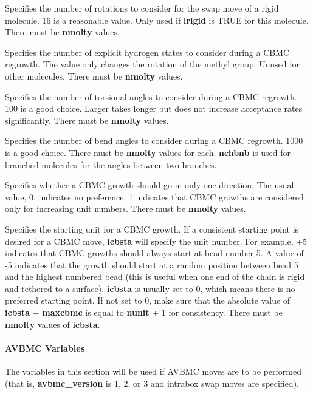 \documentclass[12pt,letterpaper]{article}
\begin{document}
 Specifies the number of rotations to
consider for the swap move of a rigid molecule. 16 is a
reasonable value. Only used if {\bf lrigid} is TRUE for this
molecule. There must be {\bf nmolty} values.

 Specifies the number of explicit
hydrogen states to consider during a CBMC regrowth. The
value only changes the rotation of the methyl group. Unused
for other molecules. There must be {\bf nmolty} values.

 Specifies the number of torsional
angles to consider during a CBMC regrowth. 100 is a good
choice. Larger takes longer but does not increase acceptance
rates significantly. There must be {\bf nmolty} values.

 Specifies the number of bend
angles to consider during a CBMC regrowth. 1000 is a good
choice. There must be \textbf{nmolty} values for each. {\bf
  nchbnb} is used for branched molecules for the angles
between two branches.

 Specifies whether a CBMC growth
should go in only one direction. The usual value, 0,
indicates no preference. 1 indicates that CBMC growths are
considered only for increasing unit numbers. There must be
{\bf nmolty} values.

 Specifies the starting unit for a
CBMC growth. If a consistent starting point is desired for a
CBMC move, {\bf icbsta} will specify the unit number. For
example, +5 indicates that CBMC growths should always start
at bead number 5. A value of -5 indicates that the growth
should start at a random position between bead 5 and the
highest numbered bead (this is useful when one end of the
chain is rigid and tethered to a surface). {\bf icbsta} is
usually set to 0, which means there is no preferred starting
point. If not set to 0, make sure that the absolute value of
{\bf icbsta} + {\bf maxcbmc} is equal to {\bf nunit} + 1 for
consistency. There must be {\bf nmolty} values of {\bf
  icbsta}.

\paragraph{AVBMC Variables}
\label{avbmc_vars}

The variables in this section will be used if AVBMC moves
are to be performed (that is, {\bf avbmc\_version} is 1, 2,
or 3 and intrabox swap moves are specified).
\end{document}
